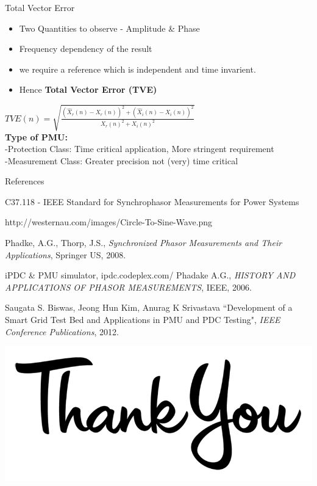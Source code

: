 \documentclass{beamer}
\begin{document}
   
   \begin{frame}{Total Vector Error}

	\begin{itemize}
	\item Two Quantities to observe - Amplitude \& Phase
	\item Frequency dependency of the result
	\item we require a reference which is  independent and time invarient.
	\item Hence \textbf{Total Vector Error (TVE)} %
	\end{itemize}
	$ TVE(n) = \sqrt{\frac{ (\hat{X}_r(n) - X_r(n))^2 + (\hat{X}_i(n)-X_i(n))^2} {X_r(n)^2 + X_i(n)^2}} $ \\
\vspace{5pt}
 \textbf{Type of PMU:}\\
 -Protection  Class: Time critical application, More stringent requirement \\ 
 -Measurement Class: Greater precision not (very) time critical 
	
   \end{frame}
    \begin{frame}{References}
\begin{thebibliography}{1}
	\tiny
	
	 C37.118 - IEEE Standard for Synchrophasor Measurements for Power Systems
	
	http://westernau.com/images/Circle-To-Sine-Wave.png
	
	Phadke, A.G., Thorp, J.S.,  \textit{Synchronized Phasor Measurements and Their Applications}, Springer US, 2008.
	
	iPDC \& PMU simulator, ipdc.codeplex.com/ 
	Phadake A.G., \textit{HISTORY AND APPLICATIONS OF PHASOR MEASUREMENTS}, IEEE, 2006.
	
	Saugata S. Biswas, Jeong Hun Kim, Anurag K Srivastava ``Development of a Smart Grid Test Bed and Applications in PMU and PDC Testing", \textit{IEEE Conference Publications}, 2012.	

\end{thebibliography}
    \end{frame}


   \begin{frame}
   \begin{center}
   \includegraphics[scale=0.3]{thanku.png}
   \end{center}
   \end{frame}
\end{document}
